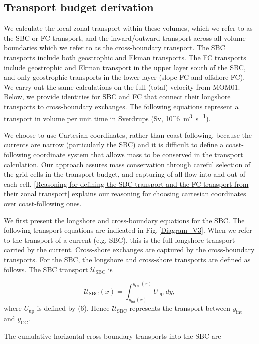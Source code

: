 \documentclass[preprint,3p,review,12pt]{elsarticle}
\newcommand{\sub}[1]{_{\text{#1}}}
\begin{document}
\subsection{Transport budget derivation} \label{Transport budget derivation}
We calculate the local zonal transport within these volumes,
which we refer to as the SBC or FC transport, and the inward/outward transport across all volume boundaries which we refer to as the cross-boundary transport. The SBC transports include both geostrophic and Ekman transports. The FC transports include geostrophic and Ekman transport in the upper layer south of the SBC, and only geostrophic transports in the lower layer (slope-FC and offshore-FC).
We carry out the same calculations on the full (total) velocity from MOM01.
Below, we provide identities for SBC and FC that connect their longshore transports to cross-boundary exchanges. The following equations represent a transport in volume per unit time in Sverdrups (\si{Sv},  \SI[parse-numbers=false]{10^6}{\cubic\meter\per\second}).

We choose to use Cartesian coordinates, rather than coast-following, because the currents are narrow (particularly the SBC) and it is difficult to define a coast-following coordinate system that allows mass to be conserved in the transport calculation. Our approach assures mass conservation through careful selection of the grid cells in the transport budget, and capturing of all flow into and out of each cell. \ref{Reasoning for defining the SBC transport and the FC transport from their zonal transport} explains our reasoning for choosing cartesian coordinates over coast-following ones.

We first present the longshore and cross-boundary equations for the SBC\@. The following transport equations are indicated in Fig.\,\ref{Diagram_V3}. When we refer to the transport of a current (e.g. SBC), this is the full longshore transport carried by the current. Cross-shore exchanges are captured by the cross-boundary transports. For the SBC, the longshore and cross-shore transports are defined as follows. The SBC transport $\mathcal{U}\sub{SBC}$ is 

\begin{equation} \label{eq:3}
\mathcal{U}\sub{SBC}(x) = \int_{y\sub{int}(x)}^{y\sub{CC}(x)}{U}\sub{up}\ dy,
\end{equation}
%
where $U\sub{up}$ is defined by (6). Hence $\mathcal{U}\sub{SBC}$ represents the transport between $y\sub{int}$ and $y\sub{CC}$. 

The cumulative horizontal cross-boundary transports into the SBC are 
\end{document}
